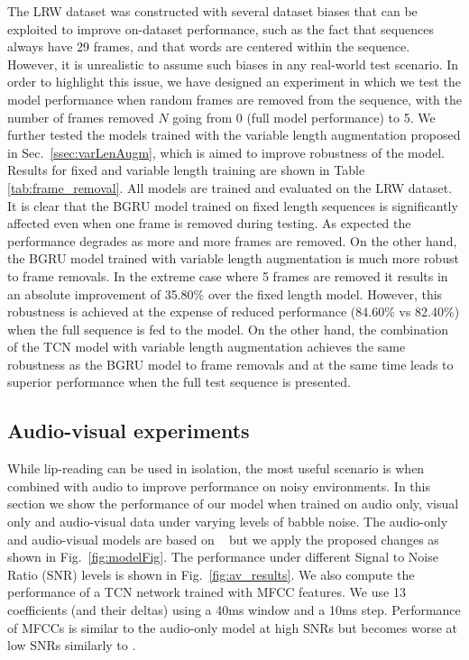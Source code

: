 \documentclass{article}
\begin{document}
The LRW dataset was constructed with several dataset biases that can be exploited to improve on-dataset performance, such as the fact that sequences always have 29 frames, and that words are centered within the sequence. However, it is unrealistic to assume such biases in any real-world test scenario. In order to highlight this issue, we have designed an experiment in which we test the model performance when random frames are removed from the sequence, with the number of frames removed $N$ going from 0 (full model performance) to 5. We further tested the models trained with the variable length augmentation proposed in Sec.~\ref{ssec:varLenAugm}, which is aimed to improve robustness of the model. Results for fixed and variable length training are shown in Table \ref{tab:frame_removal}. All models are trained and evaluated on the LRW dataset. It is clear that the BGRU model trained on fixed length sequences is significantly affected even when one frame is removed during testing. As expected the performance degrades as more and more frames are removed. On the other hand, the BGRU model trained with variable length augmentation is much more robust to frame removals. In the extreme case where 5 frames are removed it results in an absolute improvement of 35.80\% over the fixed length model. However, this robustness is achieved at the expense of reduced performance (84.60\% vs 82.40\%) when the full sequence is fed to the model. On the other hand, the combination of the TCN model with variable length augmentation achieves the same robustness as the BGRU model to frame removals and at the same time leads to superior performance when the full test sequence is presented.  





\subsection{Audio-visual experiments}

While lip-reading can be used in isolation, the most useful scenario is when combined with audio to improve performance on noisy environments. In this section we show the performance of our model when trained on audio only, visual only and audio-visual data under varying levels of babble noise. The audio-only and audio-visual models are based on ~\cite{petridis18} but we apply the proposed changes as shown in Fig.~\ref{fig:modelFig}. The performance under different Signal to Noise Ratio (SNR) levels is shown in Fig.~\ref{fig:av_results}. We also compute the performance of a TCN network trained with MFCC features. We use 13 coefficients (and their deltas) using a 40ms window and a 10ms step. Performance of MFCCs is similar to the audio-only model at high SNRs but becomes worse at low SNRs similarly to \cite{petridis18}.
\end{document}
